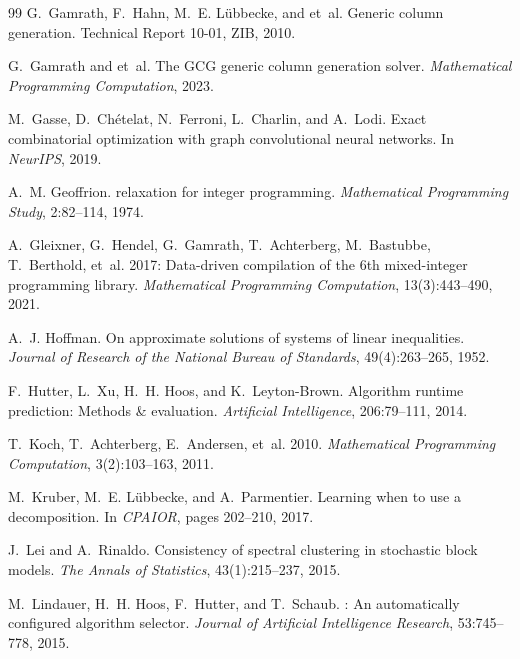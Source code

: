 \documentclass[12pt]{article}
\begin{document}
\begin{thebibliography}{99}
G.~Gamrath, F.~Hahn, M.~E. L\"ubbecke, and et~al.
\newblock Generic column generation.
\newblock Technical Report 10-01, ZIB, 2010.

G.~Gamrath and et~al.
\newblock The {GCG} generic column generation solver.
\newblock \emph{Mathematical Programming Computation}, 2023.

M.~Gasse, D.~Ch\'etelat, N.~Ferroni, L.~Charlin, and A.~Lodi.
\newblock Exact combinatorial optimization with graph convolutional neural
  networks.
\newblock In \emph{NeurIPS}, 2019.

A.~M. Geoffrion.
 relaxation for integer programming.
\newblock \emph{Mathematical Programming Study}, 2:82--114, 1974.

A.~Gleixner, G.~Hendel, G.~Gamrath, T.~Achterberg, M.~Bastubbe,
  T.~Berthold, et~al.
 2017: Data-driven compilation of the 6th mixed-integer
  programming library.
\newblock \emph{Mathematical Programming Computation}, 13(3):443--490, 2021.

A.~J. Hoffman.
\newblock On approximate solutions of systems of linear inequalities.
\newblock \emph{Journal of Research of the National Bureau of Standards},
  49(4):263--265, 1952.

F.~Hutter, L.~Xu, H.~H. Hoos, and K.~Leyton-Brown.
\newblock Algorithm runtime prediction: Methods \& evaluation.
\newblock \emph{Artificial Intelligence}, 206:79--111, 2014.

T.~Koch, T.~Achterberg, E.~Andersen, et~al.
 2010.
\newblock \emph{Mathematical Programming Computation}, 3(2):103--163, 2011.

M.~Kruber, M.~E. L\"ubbecke, and A.~Parmentier.
\newblock Learning when to use a decomposition.
\newblock In \emph{CPAIOR}, pages 202--210, 2017.

J.~Lei and A.~Rinaldo.
\newblock Consistency of spectral clustering in stochastic block models.
\newblock \emph{The Annals of Statistics}, 43(1):215--237, 2015.

M.~Lindauer, H.~H. Hoos, F.~Hutter, and T.~Schaub.
: An automatically configured algorithm selector.
\newblock \emph{Journal of Artificial Intelligence Research}, 53:745--778, 2015.


\end{thebibliography}
\end{document}
